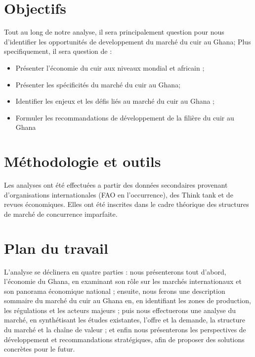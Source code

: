 \section*{Objectifs}
	Tout au long de notre analyse, il sera principalement question pour nous d'identifier les opportunités de developpement du marché du cuir au Ghana; Plus specifiquement, il sera question de : 
	\begin{itemize}
		\item Présenter l'économie du cuir aux niveaux mondial et africain ;
		\item Présenter les spécificités du marché du cuir au Ghana;
		\item Identifier les enjeux et les défis liés au marché du cuir au Ghana ;
		\item Formuler les recommandations de développement de la filière du cuir au Ghana
	\end{itemize}
\section*{Méthodologie et outils}
	Les analyses ont été effectuées a partir des données secondaires provenant d'organisations internationales (FAO en l'occurrence), des Think tank et de revues économiques. Elles ont été inscrites dans le cadre théorique des structures de marché de concurrence imparfaite. 
\vspace{0.4cm}
\section*{Plan du travail}
	L'analyse se déclinera en quatre parties :  nous présenterons tout d'abord, l'économie du Ghana, en examinant son rôle sur les marchés internationaux et son panorama économique national ; ensuite, nous ferons une description  sommaire du marché du cuir au Ghana en, en identifiant les zones de production, les régulations et les acteurs majeurs ; puis nous effectuerons une analyse du marché, en synthétisant les études existantes, l'offre et la demande, la structure du marché et la chaîne de valeur ; et enfin nous présenterons  les perspectives de développement et recommandations stratégiques, afin de proposer des solutions concrètes pour le futur.
\newpage
\chaptitle
\fancyhead[l]{}
\vspace{0.2cm}\vspace{-0.7cm}


